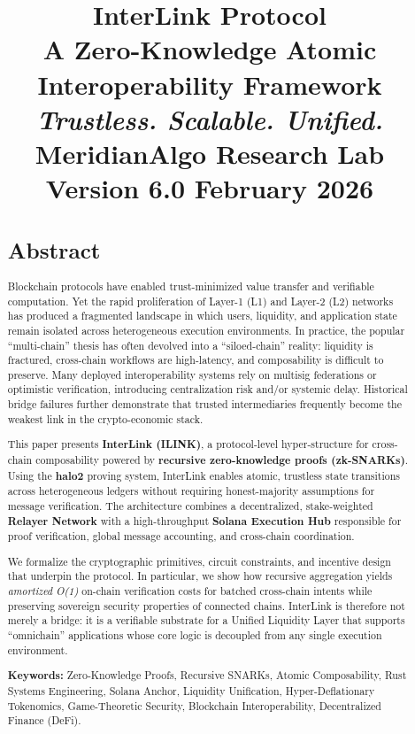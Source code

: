 \documentclass[11pt,a4paper]{article}
\title{
    \vspace{2in}
    \textbf{\Huge InterLink Protocol}\\
    \vspace{0.5in}
    \large A Zero-Knowledge Atomic Interoperability Framework\\
    \vspace{0.2in}
    \textit{Trustless. Scalable. Unified.}\\
    \vspace{1in}
    \textbf{MeridianAlgo Research Lab}\\
    \small Version 6.0 February 2026
}
\author{}
\date{}
\begin{document}
\maketitle
\begin{titlepage}
\maketitle
\end{titlepage}
\newpage

\tableofcontents
{}
{}
\begin{abstract}
\section*{Abstract}
 Blockchain protocols have enabled trust-minimized value transfer and verifiable computation. Yet the rapid proliferation of Layer-1 (L1) and Layer-2 (L2) networks has produced a fragmented landscape in which users, liquidity, and application state remain isolated across heterogeneous execution environments. In practice, the popular ``multi-chain'' thesis has often devolved into a ``siloed-chain'' reality: liquidity is fractured, cross-chain workflows are high-latency, and composability is difficult to preserve. Many deployed interoperability systems rely on multisig federations or optimistic verification, introducing centralization risk and/or systemic delay. Historical bridge failures further demonstrate that trusted intermediaries frequently become the weakest link in the crypto-economic stack.

 This paper presents \textbf{InterLink (ILINK)}, a protocol-level hyper-structure for cross-chain composability powered by \textbf{recursive zero-knowledge proofs (zk-SNARKs)}. Using the \textbf{halo2} proving system, InterLink enables atomic, trustless state transitions across heterogeneous ledgers without requiring honest-majority assumptions for message verification. The architecture combines a decentralized, stake-weighted \textbf{Relayer Network} with a high-throughput \textbf{Solana Execution Hub} responsible for proof verification, global message accounting, and cross-chain coordination.

 We formalize the cryptographic primitives, circuit constraints, and incentive design that underpin the protocol. In particular, we show how recursive aggregation yields \emph{amortized O(1)} on-chain verification costs for batched cross-chain intents while preserving sovereign security properties of connected chains. InterLink is therefore not merely a bridge: it is a verifiable substrate for a Unified Liquidity Layer that supports ``omnichain'' applications whose core logic is decoupled from any single execution environment.

\vspace{0.5in}
\textbf{Keywords:} Zero-Knowledge Proofs, Recursive SNARKs, Atomic Composability, Rust Systems Engineering, Solana Anchor, Liquidity Unification, Hyper-Deflationary Tokenomics, Game-Theoretic Security, Blockchain Interoperability, Decentralized Finance (DeFi).
\end{abstract}
\end{document}
